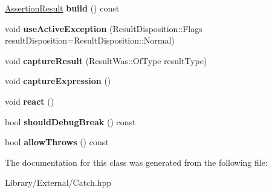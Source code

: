 \begin{DoxyCompactItemize}
\item 
\hypertarget{class_catch_1_1_result_builder_a31eba48feb02817d2151e31bd8331eeb}{}\hyperlink{class_catch_1_1_assertion_result}{Assertion\+Result} {\bfseries build} () const \label{class_catch_1_1_result_builder_a31eba48feb02817d2151e31bd8331eeb}

\item 
\hypertarget{class_catch_1_1_result_builder_a5bbd2f14a678f3e8d0f791ac6d233d65}{}void {\bfseries use\+Active\+Exception} (Result\+Disposition\+::\+Flags result\+Disposition=Result\+Disposition\+::\+Normal)\label{class_catch_1_1_result_builder_a5bbd2f14a678f3e8d0f791ac6d233d65}

\item 
\hypertarget{class_catch_1_1_result_builder_a10e467f7b7a4976e5d148b4d5066e8fd}{}void {\bfseries capture\+Result} (Result\+Was\+::\+Of\+Type result\+Type)\label{class_catch_1_1_result_builder_a10e467f7b7a4976e5d148b4d5066e8fd}

\item 
\hypertarget{class_catch_1_1_result_builder_af2ae2343965802eeeb0abbd4ea9d2d36}{}void {\bfseries capture\+Expression} ()\label{class_catch_1_1_result_builder_af2ae2343965802eeeb0abbd4ea9d2d36}

\item 
\hypertarget{class_catch_1_1_result_builder_a3085cdc46533d45bed6f652a2ac295c0}{}void {\bfseries react} ()\label{class_catch_1_1_result_builder_a3085cdc46533d45bed6f652a2ac295c0}

\item 
\hypertarget{class_catch_1_1_result_builder_a34cdbf7ad1e5b3cb4a94047f2d14bcb2}{}bool {\bfseries should\+Debug\+Break} () const \label{class_catch_1_1_result_builder_a34cdbf7ad1e5b3cb4a94047f2d14bcb2}

\item 
\hypertarget{class_catch_1_1_result_builder_a3dbf18a3a4b00173dab052a8864e435e}{}bool {\bfseries allow\+Throws} () const \label{class_catch_1_1_result_builder_a3dbf18a3a4b00173dab052a8864e435e}

\end{DoxyCompactItemize}


The documentation for this class was generated from the following file\+:\begin{DoxyCompactItemize}
\item 
Library/\+External/Catch.\+hpp\end{DoxyCompactItemize}
